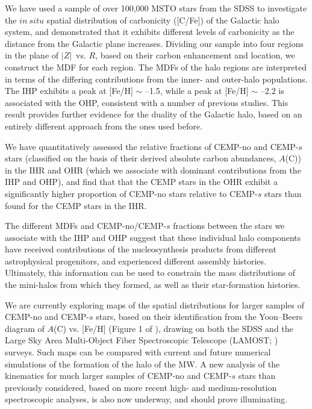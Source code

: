 \documentclass[iop]{emulateapj}
\newcommand*{\z}{$|Z|$}
\begin{document}
We have used a sample of over 100,000 MSTO stars from the SDSS to
investigate the $in~situ$ spatial distribution of carbonicity ([C/Fe])
of the Galactic halo system, and demonstrated that it exhibits different
levels of carbonicity as the distance from the Galactic plane increases.
Dividing our sample into four regions in the plane of \z\ vs. $R$, based on
their carbon enhancement and location, we construct the MDF for each
region. The MDFs of the halo regions are interpreted in terms of the
differing contributions from the inner- and outer-halo populations. The
IHP exhibits a peak at [Fe/H] $\sim$ --1.5, while a peak at [Fe/H]
$\sim$ --2.2 is associated with the OHP, consistent with a number of
previous studies. This result provides further evidence for the duality
of the Galactic halo, based on an entirely different approach from the
ones used before.

We have quantitatively assessed the relative fractions of CEMP-no and
CEMP-$s$ stars (classified on the basis of their derived absolute carbon
abundances, $A$(C)) in the IHR and OHR (which we associate with dominant
contributions from the IHP and OHP), and find that that the CEMP stars
in the OHR exhibit a significantly higher proportion of CEMP-no stars
relative to CEMP-$s$ stars than found for the CEMP stars in the IHR.

The different MDFs and CEMP-no/CEMP-$s$ fractions between the stars we
associate with the IHP and OHP suggest that these individual halo components
have received contributions of the nucleosynthesis products from
different astrophysical progenitors, and experienced different assembly
histories. Ultimately, this information can be used to constrain the
mass distributions of the mini-halos from which they formed, as well as
their star-formation histories.

We are currently exploring maps of the spatial distributions for larger
samples of CEMP-no and CEMP-$s$ stars, based on their identification
from the Yoon--Beers diagram of $A$(C) vs. [Fe/H] (Figure 1 of
\citealt{yoon2016}), drawing on both the SDSS and the Large Sky Area
Multi-Object Fiber Spectroscopic Telescope (LAMOST;
\citealt{cui2012}) surveys.  Such maps can be compared with current and
future numerical simulations of the formation of the halo of the MW. A
new analysis of the kinematics for much larger samples of CEMP-no and
CEMP-$s$ stars than previously considered, based on more recent high-
and medium-resolution spectroscopic analyses, is also now underway, and
should prove illuminating.
\end{document}
